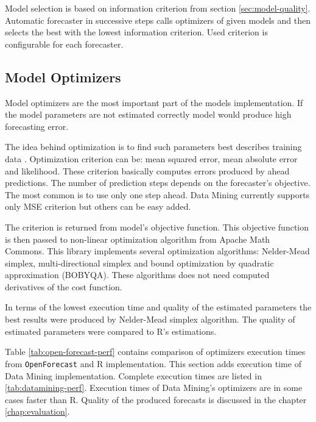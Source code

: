         Model selection is based on information criterion from section \ref{sec:model-quality}. Automatic forecaster in
        successive steps calls optimizers of given models and then selects the best with the lowest information
        criterion. Used criterion is configurable for each forecaster.

        \subsection{Model Optimizers}
        Model optimizers are the most important part of the models implementation. If the model parameters are not
        estimated correctly model would produce high forecasting error.

        The idea behind optimization is to find such
        parameters best describes training data \cite{hyndman-state-space}. Optimization criterion can be: mean
        squared error, mean absolute error and likelihood. These criterion basically computes errors produced by ahead
        predictions. The number of prediction steps depends on the forecaster's objective. The most common is to use
        only one step ahead. Data Mining currently supports only MSE criterion but others can be easy added.

        The criterion is returned from model's objective function. This objective function is then passed to non-linear
        optimization algorithm from Apache Math Commons. This library implements several optimization algorithms:
        Nelder-Mead simplex, multi-directional simplex and bound optimization by quadratic approximation (BOBYQA). These
        algorithms
        does not need computed derivatives of the cost function.

        In terms of the lowest execution time and quality of the estimated parameters the best results were produced by
        Nelder-Mead simplex algorithm. The quality of estimated parameters were compared to R's estimations.

        Table \ref{tab:open-forecast-perf} contains comparison of optimizers execution times from \texttt{OpenForecast}
        and R implementation. This section adds execution time of Data Mining implementation. Complete execution times are
        listed in \ref{tab:datamining-perf}. Execution times of Data Mining's optimizers are in some cases faster than R.
        Quality of the produced forecasts is discussed in the chapter \ref{chap:evaluation}.

